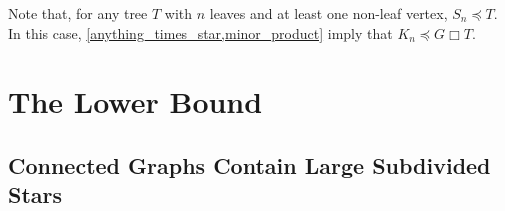 \documentclass{patmorin}
\newcommand{\defn}[1]{\textcolor{Maroon}{\emph{#1}}}
\newcommand{\boxprod}{\mathbin{\Box}}
\renewcommand{\ge}{\geqslant}
\renewcommand{\geq}{\geqslant}
\DeclareMathOperator{\gm}{gm}
\theoremstyle{plain}
\newtheorem{lem}[thm]{Lemma}
\theoremstyle{definition}
\begin{document}
Note that, for any tree $T$ with $n$ leaves and at least one non-leaf vertex, $S_n\preceq T$.  In this case, \cref{anything_times_star,minor_product} imply that $K_n\preceq G\boxprod T$.

\section{The Lower Bound}\label{B}


\subsection{Connected Graphs Contain Large Subdivided Stars}





\end{document}
